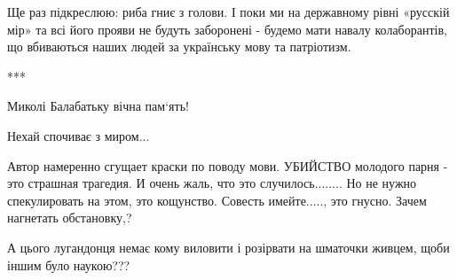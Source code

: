 Ще раз підкреслюю: риба гниє з голови. І поки ми на державному рівні «русскій
мір» та всі його прояви не будуть заборонені - будемо мати навалу колаборантів,
що вбиваються наших людей за українську мову та патріотизм. 

***

Миколі Балабатьку вічна пам‘ять! 

Нехай спочиває з миром...

\begin{cmtfront}

Автор намеренно сгущает краски по поводу мови.  УБИЙСТВО молодого парня - это
страшная трагедия. И очень жаль, что это случилось........  Но не нужно
спекулировать на этом, это кощунство. Совесть имейте....., это гнусно.
Зачем нагнетать обстановку,?


А цього лугандонця немає кому виловити і розірвати на шматочки живцем, щоби
іншим було наукою???
	
\end{cmtfront}

